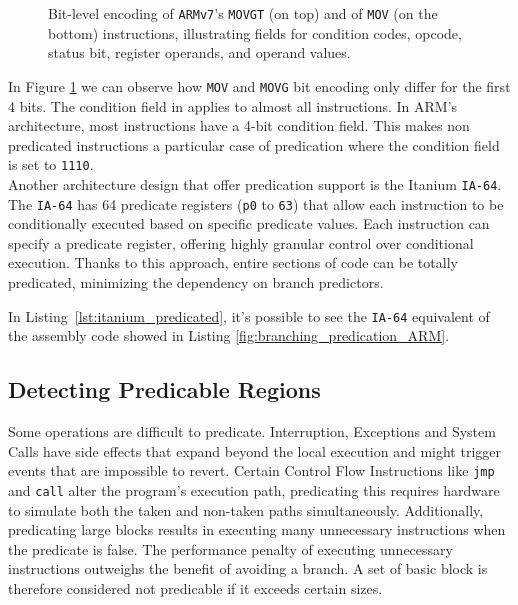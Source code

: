\begin{figure}[H]
    \centering
    
    
    \caption{Bit-level encoding of \texttt{ARMv7}'s \texttt{MOVGT} (on top) and of \texttt{MOV} (on the bottom) instructions, illustrating fields for condition codes, opcode, status bit, register operands, and operand values.}
    \label{fig:mov_encoding}
\end{figure}

In Figure \ref{fig:mov_encoding} we can observe how \texttt{MOV} and \texttt{MOVG} bit encoding only differ for the first 4 bits.
The condition field in \armvs applies to almost all instructions. In ARM’s architecture, most instructions have a 4-bit condition field. This makes non predicated instructions a particular case of predication where the condition field is set to \texttt{1110}. \\

Another architecture design that offer predication support is the Itanium \texttt{IA-64}. 
The \texttt{IA-64} has 64 predicate registers (\texttt{p0} to \texttt{63}) that allow each instruction to be conditionally executed based on specific predicate values. Each instruction can specify a predicate register, offering highly granular control over conditional execution. Thanks to this approach, entire sections of code can be totally predicated, minimizing the dependency on branch predictors.

\begin{center}
\begin{minipage}{0.5\textwidth}

\end{minipage}
\end{center}

In Listing~\ref{lst:itanium_predicated}, it's possible to see the \texttt{IA-64} equivalent of the assembly code showed in Listing \ref{fig:branching_predication_ARM}.

\subsection{Detecting Predicable Regions}
\label{sec:detecting_pred}

Some operations are difficult to predicate. Interruption, Exceptions and System Calls have side effects that expand beyond the local execution and might trigger events that are impossible to revert. Certain Control Flow Instructions like \texttt{jmp} and \texttt{call} alter the program’s execution path, predicating this requires hardware to simulate both the taken and non-taken paths simultaneously.
Additionally, predicating large blocks results in executing many unnecessary instructions when the predicate is false. The performance penalty of executing unnecessary instructions outweighs the benefit of avoiding a branch. A set of basic block is therefore considered not predicable if it exceeds certain sizes.

